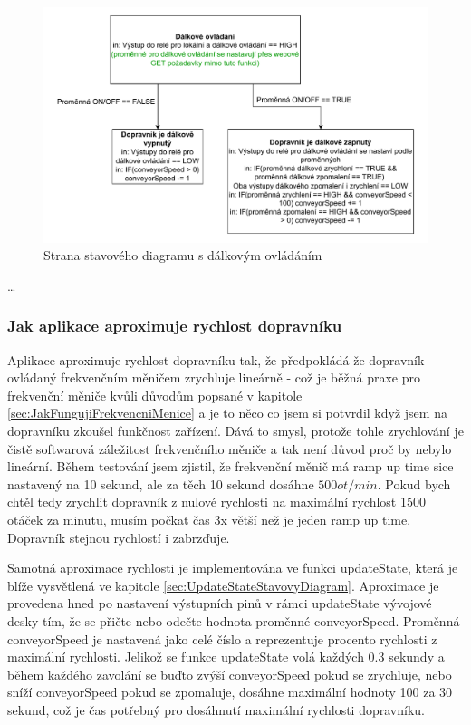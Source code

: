 \begin{figure}[H]
    \centering
    \includegraphics[width=1\linewidth]{images/StateFlow_Firmwaru_right.drawio.pdf}
    \caption{Strana stavového diagramu s dálkovým ovládáním}
    \label{fig:StateFlow_Firmwaru_right}
\end{figure}
\dots

\subsubsection{Jak aplikace aproximuje rychlost dopravníku}\label{sec:AproximaceRychlostiDopravniku}

Aplikace aproximuje rychlost dopravníku tak, že předpokládá že dopravník ovládaný frekvenčním měničem zrychluje lineárně - což je běžná praxe pro frekvenční měniče kvůli důvodům popsané v kapitole \ref{sec:JakFungujiFrekvencniMenice} a je to něco co jsem si potvrdil když jsem na dopravníku zkoušel funkčnost zařízení. Dává to smysl, protože tohle zrychlování je čistě softwarová záležitost frekvenčního měniče a tak není důvod proč by nebylo lineární. Během testování jsem zjistil, že frekvenční měnič má ramp up time sice nastavený na 10 sekund, ale za těch 10 sekund dosáhne $500 ot/min$. Pokud bych chtěl tedy zrychlit dopravník z nulové rychlosti na maximální rychlost 1500 otáček za minutu, musím počkat čas 3x větší než je jeden ramp up time. Dopravník stejnou rychlostí i zabrzďuje.

Samotná aproximace rychlosti je implementována ve funkci updateState, která je blíže vysvětlená ve kapitole \ref{sec:UpdateStateStavovyDiagram}. Aproximace je provedena hned po nastavení výstupních pinů v rámci updateState vývojové desky tím, že se přičte nebo odečte hodnota proměnné conveyorSpeed. Proměnná conveyorSpeed je nastavená jako celé číslo a reprezentuje procento rychlosti z maximální rychlosti. Jelikož se funkce updateState volá každých 0.3 sekundy a během každého zavolání se buďto zvýší conveyorSpeed pokud se zrychluje, nebo sníží conveyorSpeed pokud se zpomaluje, dosáhne maximální hodnoty 100 za 30 sekund, což je čas potřebný pro dosáhnutí maximální rychlosti dopravníku.

